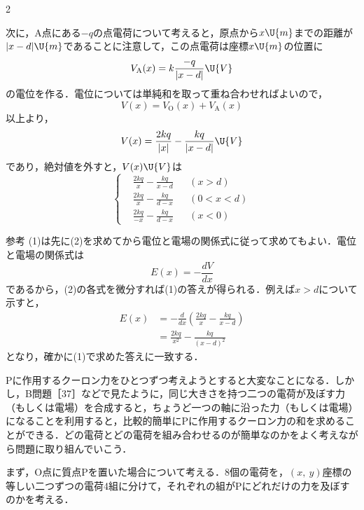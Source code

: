\begin{multicols}{2}
\begin{komon}
       次に，$\mathrm{A}$点にある$-q$の点電荷について考えると，原点から$x\U{m}$までの距離が$|x-d|\U{m}$であることに注意して，この点電荷は座標$x\U{m}$の位置に
       \[V_{\mathrm{A}}(x)=k\frac{-q}{|x-d|}\U{V}\]
       の電位を作る．電位については単純和を取って重ね合わせればよいので，
       \[V(x)=V_{\mathrm{O}}(x)+V_{\mathrm{A}}(x)\]
       以上より，
       \[V(x)=\frac{2kq}{|x|}-\frac{kq}{|x-d|}\U{V}\]
       であり，絶対値を外すと，$V(x)\U{V}$は
       \[\left\{\begin{aligned}
         &\frac{2kq}{x}-\frac{kq}{x-d}&&(x>d)\\
         &\frac{2kq}{x}-\frac{kq}{d-x}&&(0<x<d)\\
         &\frac{2kq}{-x}-\frac{kq}{d-x}&&(x<0)
       \end{aligned}\right.\]
       \hspace*{\fill}\Ans
\end{komon}
\begin{bsHosoku}{参考}
(1)は先に(2)を求めてから電位と電場の関係式に従って求めてもよい．電位と電場の関係式は
\[E(x)=-\frac{dV}{dx}\]
であるから，(2)の各式を微分すれば(1)の答えが得られる．例えば$x>d$について示すと，
\[\begin{aligned}
 E(x)&=-\frac{d}{dx}\left(\frac{2kq}{x}-\frac{kq}{x-d}\right)\\
     &=\frac{2kq}{x^2}-\frac{kq}{(x-d)^2}
\end{aligned}\]
となり，確かに(1)で求めた答えに一致する．
\end{bsHosoku}

\par\nopagebreak
\begin{sisin}
$\mathrm{P}$に作用するクーロン力をひとつずつ考えようとすると大変なことになる．しかし，B問題［37］などで見たように，{\gtfamily 同じ大きさを持つ二つの電荷が及ぼす力（もしくは電場）を合成すると，ちょうど一つの軸に沿った力（もしくは電場）になる}ことを利用すると，比較的簡単に$\mathrm{P}$に作用するクーロン力の和を求めることができる．どの電荷とどの電荷を組み合わせるのが簡単なのかをよく考えながら問題に取り組んでいこう．
\end{sisin}
\KaiHead
まず，$\mathrm{O}$点に質点$\mathrm{P}$を置いた場合について考える．8個の電荷を，$(x,\ y)$座標の等しい二つずつの電荷4組に分けて，それぞれの組が$\mathrm{P}$にどれだけの力を及ぼすのかを考える．


\end{multicols}

